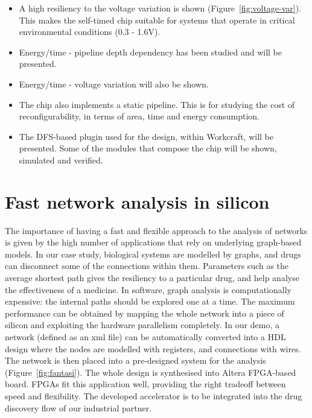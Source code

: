 \documentclass[conference]{IEEEtran}
\begin{document}
\noindent
\begin{itemize}
\item A high resiliency to the voltage variation is shown (Figure~\ref{fig:voltage-var}).
This makes the self-timed chip suitable for systems that operate in critical environmental conditions (0.3 - 1.6V).
\item Energy/time - pipeline depth dependency has been studied and will be presented.
\item Energy/time - voltage variation will also be shown.
\item The chip also implements a static pipeline. This is for studying the
cost of reconfigurability, in terms of area, time and energy consumption.
\item The DFS-based plugin used for the design, within Workcraft, will be presented.
Some of the modules that compose the chip will be shown, simulated and verified.
\end{itemize}

\section*{Fast network analysis in silicon}
The importance of having a fast and flexible approach to the analysis of networks is given by
the high number of applications that rely on underlying graph-based models. In our case study,
biological systems are modelled by graphs, and drugs can disconnect some of the connections
within them. Parameters such as the average shortest path gives the resiliency to a particular
drug, and help analyse the effectiveness of a medicine. In software, graph analysis is
computationally expensive: the internal paths should be explored one at a time. 
The maximum performance can be obtained by mapping the whole network into a piece of silicon
and exploiting the hardware parallelism completely. In our demo, a network (defined as an xml
file) can be automatically converted into a HDL design where the nodes are modelled with
registers, and connections with wires. The network is then placed into a pre-designed system
for the analysis (Figure~\ref{fig:fantasi}). The whole design is synthesised into Altera
FPGA-based board. FPGAs fit this application well, providing the right tradeoff between speed
and flexibility. The developed accelerator is to be integrated into the drug discovery flow of
our industrial partner.
\end{document}
